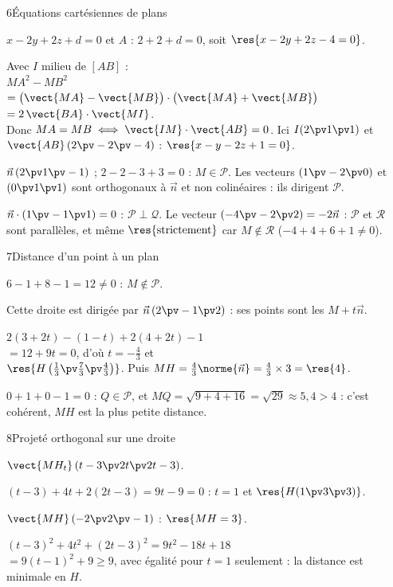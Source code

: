 \begin{deuxcolonnes}
\begin{corrige}{6}{Équations cartésiennes de plans}
\begin{questions}
  \item $x-2y+2z+d=0$ et $A$ : $2+2+d=0$, soit $\res{x-2y+2z-4=0}$.
  \item Avec $I$ milieu de $[AB]$ :\\ $MA^2-MB^2$\\ $=\big(\vect{MA}-\vect{MB}\big)\cdot\big(\vect{MA}+\vect{MB}\big)$\\
    $=2\,\vect{BA}\cdot\vect{MI}$.\\ Donc $MA=MB\iff\vect{IM}\cdot\vect{AB}=0$. Ici $I(2\pv1\pv1)$ et $\vect{AB}\,(2\pv-2\pv-4)$ :
    $\res{x-y-2z+1=0}$.
  \item $\vec n\,(2\pv1\pv-1)$ ; $2-2-3+3=0$ : $M\in\mathcal{P}$. Les vecteurs $(1\pv-2\pv0)$ et $(0\pv1\pv1)$ sont orthogonaux à
    $\vec n$ et non colinéaires : ils dirigent $\mathcal{P}$.
  \item $\vec n\cdot(1\pv-1\pv1)=0$ : $\mathcal{P}\perp\mathcal{Q}$. Le vecteur $(-4\pv-2\pv2)=-2\vec n$ : $\mathcal{P}$ et
    $\mathcal{R}$ sont parallèles, et même $\res{\text{strictement}}$ car $M\notin\mathcal{R}$ ($-4+4+6+1\neq0$).
\end{questions}
\end{corrige}

\begin{corrige}{7}{Distance d'un point à un plan}
\begin{questions}
  \item $6-1+8-1=12\neq0$ : $M\notin\mathcal{P}$.
  \item Cette droite est dirigée par $\vec n\,(2\pv-1\pv2)$ : ses points sont les $M+t\vec n$.
  \item $2(3+2t)-(1-t)+2(4+2t)-1$\\ $=12+9t=0$, d'où $t=-\frac43$ et\\ $\res{H\left(\tfrac13\pv\tfrac73\pv\tfrac43\right)}$.
    Puis $MH=\frac43\norme{\vec n}=\frac43\times3=\res{4}$.
  \item $0+1+0-1=0$ : $Q\in\mathcal{P}$, et $MQ=\sqrt{9+4+16}=\sqrt{29}\approx5{,}4>4$ : c'est cohérent, $MH$ est la plus petite
    distance.
\end{questions}
\end{corrige}

\begin{corrige}{8}{Projeté orthogonal sur une droite}
\begin{questions}
  \item $\vect{MH_t}\,(t-3\pv2t\pv2t-3)$.
  \item $(t-3)+4t+2(2t-3)=9t-9=0$ : $t=1$ et $\res{H(1\pv3\pv3)}$.
  \item $\vect{MH}\,(-2\pv2\pv-1)$ : $\res{MH=3}$.
  \item $(t-3)^2+4t^2+(2t-3)^2=9t^2-18t+18$\\ $=9(t-1)^2+9\geq9$, avec égalité pour $t=1$ seulement : la distance est minimale en $H$.
\end{questions}
\end{corrige}

\end{deuxcolonnes}

